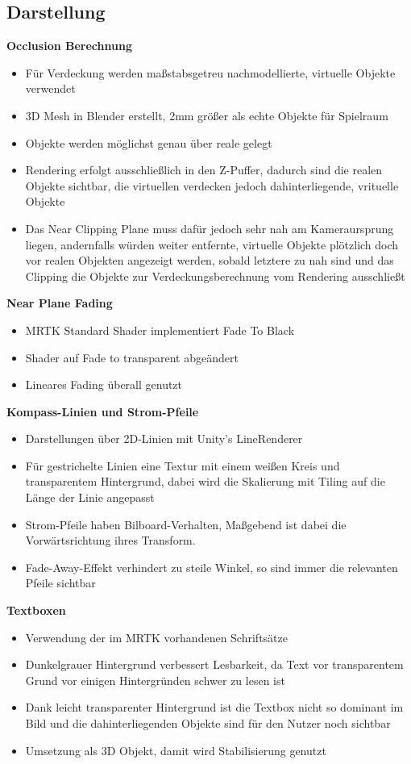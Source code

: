 \subsection{Darstellung}

\textbf{Occlusion Berechnung}
\begin{itemize}
	\item Für Verdeckung werden maßstabsgetreu nachmodellierte, virtuelle Objekte verwendet
	\item 3D Mesh in Blender erstellt, 2mm größer als echte Objekte für Spielraum
	\item Objekte werden möglichst genau über reale gelegt
	\item Rendering erfolgt ausschließlich in den Z-Puffer, dadurch sind die realen Objekte sichtbar, die virtuellen verdecken jedoch dahinterliegende, vrituelle Objekte
	\item Das Near Clipping Plane muss dafür jedoch sehr nah am Kameraursprung liegen, andernfalls würden weiter entfernte, virtuelle Objekte plötzlich doch vor realen Objekten angezeigt werden, sobald letztere zu nah sind und das Clipping die Objekte zur Verdeckungsberechnung vom Rendering ausschließt
\end{itemize}

\textbf{Near Plane Fading}
\begin{itemize}
	\item MRTK Standard Shader implementiert Fade To Black
	\item Shader auf Fade to transparent abgeändert
	\item Lineares Fading überall genutzt
\end{itemize}

\textbf{Kompass-Linien und Strom-Pfeile}
\begin{itemize}
	\item Darstellungen über 2D-Linien mit Unity's LineRenderer
	\item Für gestrichelte Linien eine Textur mit einem weißen Kreis und transparentem Hintergrund, dabei wird die Skalierung mit Tiling auf die Länge der Linie angepasst
	\item Strom-Pfeile haben Bilboard-Verhalten, Maßgebend ist dabei die Vorwärtsrichtung ihres Transform.
	\item Fade-Away-Effekt verhindert zu steile Winkel, so sind immer die relevanten Pfeile sichtbar
\end{itemize}

\textbf{Textboxen}
\begin{itemize}
	\item Verwendung der im MRTK vorhandenen Schriftsätze
	\item Dunkelgrauer Hintergrund verbessert Lesbarkeit, da Text vor transparentem Grund vor einigen Hintergründen schwer zu lesen ist
	\item Dank leicht transparenter Hintergrund ist die Textbox nicht so dominant im Bild und die dahinterliegenden Objekte sind für den Nutzer noch sichtbar
	\item Umsetzung als 3D Objekt, damit wird Stabilisierung genutzt
\end{itemize}

